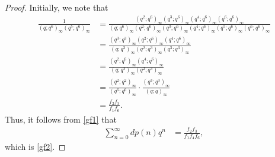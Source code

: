 \documentclass[10pt,a4paper]{amsart}
\begin{document}
\begin{proof}
Initially, we note that
\begin{align*}
\frac{1}{(q;q^6)_\infty (q^5;q^6)_\infty} & = \frac{(q^2;q^6)_\infty(q^3;q^6)_\infty(q^4;q^6)_\infty(q^6;q^6)_\infty}{(q;q^6)_\infty(q^2;q^6)_\infty(q^3;q^6)_\infty(q^4;q^6)_\infty(q^5;q^6)_\infty(q^6;q^6)_\infty} \\
& = \frac{(q^3;q^3)_\infty(q^2;q^6)_\infty(q^4;q^6)_\infty}{(q;q^3)_\infty(q^2;q^3)_\infty(q^3;q^3)_\infty} \\
& = \frac{(q^2;q^6)_\infty(q^4;q^6)_\infty}{(q;q^3)_\infty(q^2;q^3)_\infty} \\
& = \frac{(q^2;q^2)_\infty}{(q^6;q^6)_\infty}\cdot \frac{(q^3;q^3)_\infty}{(q;q)_\infty} \\
& = \frac{f_2f_3}{f_1f_6}.  
\end{align*}
Thus, it follows from \eqref{gf1} that
\begin{align*}
 \sum_{n=0}^{\infty} dp(n)q^n 
 & = \frac{f_2f_3}{f_1f_4f_6},
\end{align*}
which is \eqref{gf2}.
\end{proof}
\end{document}
